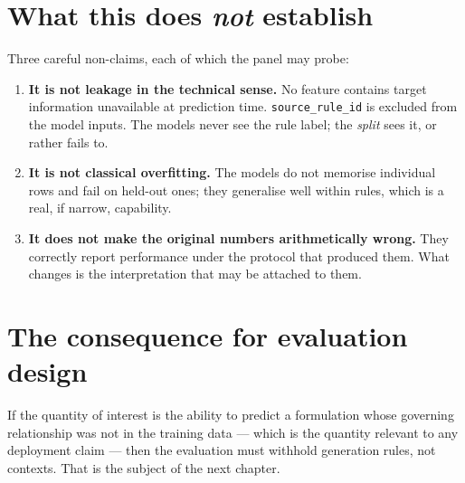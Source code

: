 \section{What this does \emph{not} establish}

Three careful non-claims, each of which the panel may probe:

\begin{enumerate}[leftmargin=1.5em, itemsep=2pt]
\item \textbf{It is not leakage in the technical sense.} No feature
  contains target information unavailable at prediction time.
  \texttt{source\_rule\_id} is excluded from the model inputs. The models
  never see the rule label; the \emph{split} sees it, or rather fails to.
\item \textbf{It is not classical overfitting.} The models do not memorise
  individual rows and fail on held-out ones; they generalise well within
  rules, which is a real, if narrow, capability.
\item \textbf{It does not make the original numbers arithmetically wrong.}
  They correctly report performance under the protocol that produced them.
  What changes is the interpretation that may be attached to them.
\end{enumerate}

\section{The consequence for evaluation design}

If the quantity of interest is the ability to predict a formulation whose
governing relationship was not in the training data --- which is the
quantity relevant to any deployment claim --- then the evaluation must
withhold generation rules, not contexts. That is the subject of the next
chapter.

